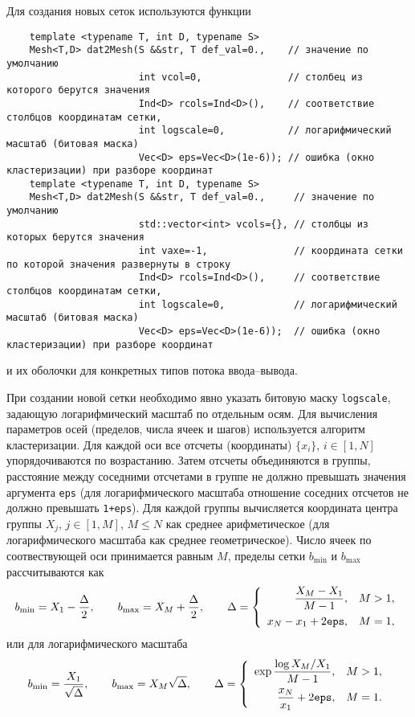 Для создания новых сеток используются функции
\begin{verbatim}
	template <typename T, int D, typename S> 
	Mesh<T,D> dat2Mesh(S &&str, T def_val=0.,    // значение по умолчанию
					   int vcol=0,               // столбец из которого берутся значения
					   Ind<D> rcols=Ind<D>(),    // соответствие столбцов координатам сетки, 
					   int logscale=0,           // логарифмический масштаб (битовая маска)
					   Vec<D> eps=Vec<D>(1e-6)); // ошибка (окно кластеризации) при разборе координат
	template <typename T, int D, typename S> 
	Mesh<T,D> dat2Mesh(S &&str, T def_val=0.,     // значение по умолчанию
					   std::vector<int> vcols={}, // столбцы из которых берутся значения
					   int vaxe=-1,               // координата сетки по которой значения развернуты в строку
					   Ind<D> rcols=Ind<D>(),     // соответствие столбцов координатам сетки, 
					   int logscale=0,            // логарифмический масштаб (битовая маска)
					   Vec<D> eps=Vec<D>(1e-6));  // ошибка (окно кластеризации) при разборе координат
\end{verbatim}
и их оболочки для конкретных типов потока ввода--вывода.

При создании новой сетки необходимо явно указать битовую маску \verb'logscale', задающую логарифмический масштаб по отдельным осям.
Для вычисления параметров осей (пределов, числа ячеек и шагов) используется алгоритм кластеризации.
Для каждой оси все отсчеты (координаты) $\{x_i\}$, $i\in[1,N]$ упорядочиваются по возрастанию. Затем отсчеты объединяются в группы,
расстояние между соседними отсчетами в группе не должно превышать значения аргумента \verb'eps' (для логарифмического масштаба отношение
соседних отсчетов не должно превышать \verb'1+eps'). Для каждой группы вычисляется
координата центра группы $X_j$, $j\in[1,M]$, $M\le N$ как среднее арифметическое (для логарифмического масштаба как среднее геометрическое).
Число ячеек по соотвествующей оси принимается равным $M$, пределы сетки $b_{\min}$  и $b_{\max}$ рассчитываются как  
$$
b_{\min} = X_1-\frac\Delta2,
\qquad b_{\max} = X_M+\frac\Delta2,
\qquad \Delta = \left\{\begin{array}{rl}
\displaystyle\frac{X_M-X_1}{M-1}, & M>1,\\[3mm]
x_N-x_1+2{\tt eps},& M=1,
\end{array}\right.
$$
или для логарифмического масштаба
$$
b_{\min} = \frac{X_1}{\sqrt\Delta},
\qquad b_{\max} = X_M\sqrt\Delta,
\qquad \Delta = \left\{\begin{array}{rl}
\displaystyle\exp\frac{\log X_M/X_1}{M-1}, & M>1,\\[3mm]
\displaystyle\frac{x_N}{x_1}+2{\tt eps},& M=1.
\end{array}\right.
$$
